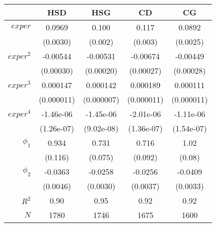 \begin{tabular}{rSSSS}
\hline
 & {HSD} & {HSG} & {CD} & {CG} \\ 
\hline
$exper$ & 0.0969 & 0.100 & 0.117 & 0.0892 \\ 
 & (0.0030) & (0.002) & (0.003) & (0.0025) \\ 
$exper^2$ & -0.00544 & -0.00531 & -0.00674 & -0.00449 \\ 
 & (0.00030) & (0.00020) & (0.00027) & (0.00028) \\ 
$exper^3$ & 0.000147 & 0.000142 & 0.000189 & 0.000111 \\ 
 & (0.000011) & (0.000007) & (0.000011) & (0.000011) \\ 
$exper^4$ & -1.46e-06 & -1.45e-06 & -2.01e-06 & -1.11e-06 \\ 
 & (1.26e-07) & (9.02e-08) & (1.36e-07) & (1.54e-07) \\ 
$\phi_{1}$ & 0.934 & 0.731 & 0.716 & 1.02 \\ 
 & (0.116) & (0.075) & (0.092) & (0.08) \\ 
$\phi_{2}$ & -0.0363 & -0.0258 & -0.0256 & -0.0409 \\ 
 & (0.0046) & (0.0030) & (0.0037) & (0.0033) \\ 
$R^2$ & 0.90 & 0.95 & 0.92 & 0.92 \\ 
$N$ & 1780 & 1746 & 1675 & 1600 \\ 
\hline
\end{tabular}%
